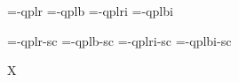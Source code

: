

\ifx\sizespec\undefined \def\sizespec{}\fi
\ifx\font\corkencoded {}\else {}\fi

\ifx\font\unicoded  {} 
\else

\font\tenrm=\tmp-qplr  \sizespec
\font\tenbf=\tmp-qplb  \sizespec
\font\tenit=\tmp-qplri \sizespec
\font\tenbi=\tmp-qplbi \sizespec

\font\tenrmc=\tmp-qplr-sc  \sizespec
\font\tenbfc=\tmp-qplb-sc  \sizespec
\font\tenitc=\tmp-qplri-sc \sizespec
\font\tenbic=\tmp-qplbi-sc \sizespec

\fi

\tenrm

\ifx\regfontdefault\undefined \else
   \regfontdefault
   \regfont\tenrmc \regfont\tenitc
   \regfont\tenbfc \regfont\tenbic
\fi

\def\caps#1{{\escapechar=-1 \expandafter}%
  \expandafter\csname\expandafter\tenonlytext\string#1c\endcsname}
\def\tenonlytext{ten}

\ifx\font\corkencoded\else \ifx\font\unicoded\else  \fi\fi
\ifx\mathpreloaded X\else  \fi                     


